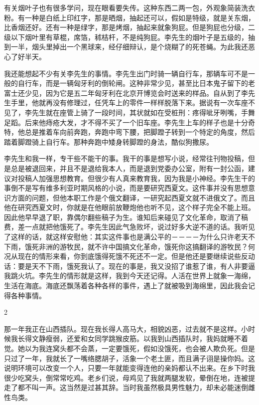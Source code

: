 有关烟叶子也有很多学问，现在眼看要失传。这种东西二两一包，外观象简装洗衣粉。有一种是白纸上印红字，那是晒烟，抽起还可以，假如是特级，就是关东烟，比香烟还好。还有一种是绿字，那是烤烟，抽起来就象狗屁。但是狗屁也分级，二级以下烟叶里有草棍，席箔，秫桔杆，不是纯狗屁。李先生的烟叶子是五级的，抽到一半，烟头里掉出一个黑球来，经仔细辩认，是个烧糊了的死苍蝇。为此我还恶心了好半天。 

我还能想起不少有关李先生的事情。李先生出门时骑一辆自行车，那辆车可不是一般的自行车，而是一辆匈牙利的倒轮闸。这种非常少见，甚至比日本鬼子留下的老富士还少见，因为它是五二年匈牙利在北京开博览会时送来的样品。自从到了李先生手里，他就再没有修理过，任凭车上的零件一样样脱落下来。据说有一次车座不见了，李先生就在座管上骑了一段时间，其状就如在受桩刑：疼得呲牙咧嘴，手舞足蹈。后来他痔疮大发，才不得不买了一个旧车座。李先生上车的样子也是十分奇特，他总是推着车向前奔跑，奔跑中弯下腰，把脚蹬子转到一个特定的角度，然后踏着脚蹬骑上自行车。那种奔跑中矮身转脚蹬的身法，酷似狗撒尿。 

李先生和我一样，专干些不能干的事。我干的事是想写小说，经常往刊物投稿，但是总是被退回来，并且不是退给我本人，而是退到党委办公室，附有一封公函，建议对投稿人加强思想教育。但很少有人真来教育我，因为我是小神经。李先生干的事倒不是写有维多利亚时期风格的小说，而是要研究西夏文。这件事并没有思想意识方面的问题，但他本职工作是个俄文翻译，一研究起西夏文就不进俄文了。而且他在研究西夏文时，你就是在他眼前放鞭炮他也听不见，这个样子完全不能上班。因此他早早退了职，靠偶尔翻些稿子为生。谁知后来碰见了文化革命，取消了稿费，差一点就把他饿死了。李先生因此气急败坏，说过好多大逆不道的话。我听见了这样的话，就这样安慰他：其实这件事也是满公平的－－－－为什么只许老天不下雨，饿死非洲的游牧民，就不许中国搞文化革命，饿死你这搞翻译的游牧民？何况从现在的情形来看，你到底饿得死饿不死还不一定。但是他还是要继续说些反动话：要是天不下雨，饿死我认了。现在的事是，我又没招了谁惹了谁，有人非要逼我跳火坑。李先生的情形就是这样，我到今天还记得。人活在世界上就象一海绵，生活在海底。海底还飘荡着各种各样的事件，遇上了就被吸到海绵里，因此我会记得各种事情。 

2 

那一年我正在山西插队。现在我长得人高马大，相貌凶恶，过去就不是这样。小时候我长得文静瘦弱，还爱和女同学跳猴皮筋。以我到山西插队时，我妈就睡不着觉。她以为我连窝头都不会蒸，一定要饿死，假如没饿死，也会被人欺负死。但是只过了一年，我就长了一嘴络腮胡子，活象一个老土匪，而且满子诩是操你妈。这说明环境可以改变一个人，只要一年就能变得连他的亲妈都认不出来。在乡下时我很少吃窝头，倒常常吃鸡。老乡们说，母鸡见了我就两腿发软，晕倒在地，连被提走了都不叫一声。这当然是过甚其辞。当时我虽然极具男性魅力，却未必能迷倒雌性鸟类。 

